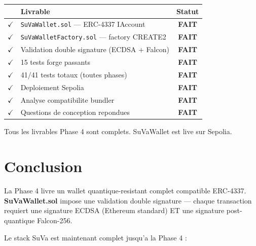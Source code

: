 \documentclass[11pt,a4paper]{article}
\begin{document}
\begin{center}
\begin{tabular}{clc}
\toprule
& \textbf{Livrable} & \textbf{Statut} \\
\midrule
$\checkmark$ & \texttt{SuVaWallet.sol} --- ERC-4337 IAccount          & \textcolor{pass-green}{\textbf{FAIT}} \\
$\checkmark$ & \texttt{SuVaWalletFactory.sol} --- factory CREATE2      & \textcolor{pass-green}{\textbf{FAIT}} \\
$\checkmark$ & Validation double signature (ECDSA + Falcon)            & \textcolor{pass-green}{\textbf{FAIT}} \\
$\checkmark$ & 15 tests forge passants                                  & \textcolor{pass-green}{\textbf{FAIT}} \\
$\checkmark$ & 41/41 tests totaux (toutes phases)                      & \textcolor{pass-green}{\textbf{FAIT}} \\
$\checkmark$ & Deploiement Sepolia                                      & \textcolor{pass-green}{\textbf{FAIT}} \\
$\checkmark$ & Analyse compatibilite bundler                            & \textcolor{pass-green}{\textbf{FAIT}} \\
$\checkmark$ & Questions de conception repondues                        & \textcolor{pass-green}{\textbf{FAIT}} \\
\bottomrule
\end{tabular}
\end{center}

\begin{resultbox}
Tous les livrables Phase 4 sont complets. SuVaWallet est live sur Sepolia.
\end{resultbox}

\section{Conclusion}

La Phase 4 livre un wallet quantique-resistant complet compatible ERC-4337. \textbf{SuVaWallet.sol}
impose une validation double signature --- chaque transaction requiert une signature ECDSA
(Ethereum standard) ET une signature post-quantique Falcon-256.

Le stack SuVa est maintenant complet jusqu'a la Phase 4 :
\end{document}
